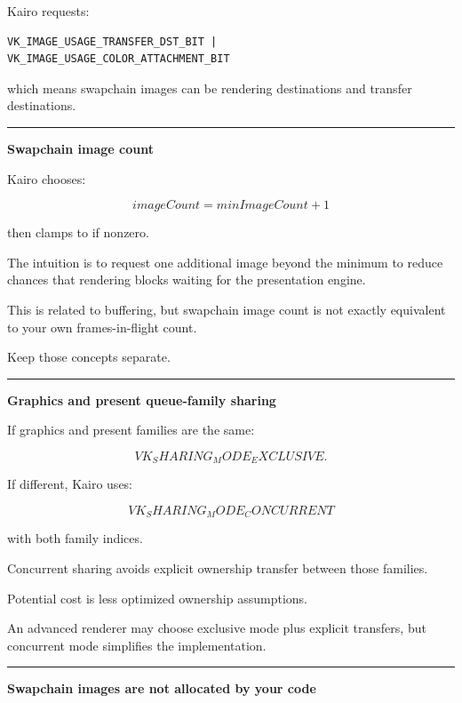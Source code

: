 Kairo requests:

\begin{verbatim}
VK_IMAGE_USAGE_TRANSFER_DST_BIT |
VK_IMAGE_USAGE_COLOR_ATTACHMENT_BIT
\end{verbatim}

which means swapchain images can be rendering destinations and transfer destinations.

\begin{center}\rule{0.5\linewidth}{0.5pt}\end{center}

\textbf{Swapchain image count}

Kairo chooses:

\[
imageCount=
minImageCount+1
\]

then clamps to  if nonzero.

The intuition is to request one additional image beyond the minimum to reduce chances that rendering blocks waiting for the presentation engine.

This is related to buffering, but swapchain image count is not exactly equivalent to your own frames-in-flight count.

Keep those concepts separate.

\begin{center}\rule{0.5\linewidth}{0.5pt}\end{center}

\textbf{Graphics and present queue-family sharing}

If graphics and present families are the same:

\[
VK_SHARING_MODE_EXCLUSIVE.
\]

If different, Kairo uses:

\[
VK_SHARING_MODE_CONCURRENT
\]

with both family indices.

Concurrent sharing avoids explicit ownership transfer between those families.

Potential cost is less optimized ownership assumptions.

An advanced renderer may choose exclusive mode plus explicit transfers, but concurrent mode simplifies the implementation.

\begin{center}\rule{0.5\linewidth}{0.5pt}\end{center}

\textbf{Swapchain images are not allocated by your code}

